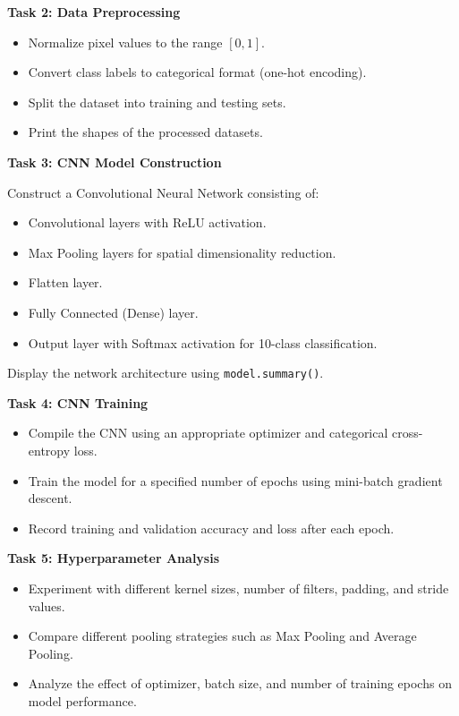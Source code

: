 \documentclass[11pt]{article}
\begin{document}
\bigskip

\textbf{Task 2: Data Preprocessing}

\begin{itemize}
    \item Normalize pixel values to the range $[0,1]$.
    \item Convert class labels to categorical format (one-hot encoding).
    \item Split the dataset into training and testing sets.
    \item Print the shapes of the processed datasets.
\end{itemize}


\bigskip

\textbf{Task 3: CNN Model Construction}

Construct a Convolutional Neural Network consisting of:

\begin{itemize}
    \item Convolutional layers with ReLU activation.
    \item Max Pooling layers for spatial dimensionality reduction.
    \item Flatten layer.
    \item Fully Connected (Dense) layer.
    \item Output layer with Softmax activation for 10-class classification.
\end{itemize}

Display the network architecture using \texttt{model.summary()}.


\bigskip

\textbf{Task 4: CNN Training}

\begin{itemize}
    \item Compile the CNN using an appropriate optimizer and categorical cross-entropy loss.
    \item Train the model for a specified number of epochs using mini-batch gradient descent.
    \item Record training and validation accuracy and loss after each epoch.
\end{itemize}

\bigskip

\textbf{Task 5: Hyperparameter Analysis}

\begin{itemize}
    \item Experiment with different kernel sizes, number of filters, padding, and stride values.
    \item Compare different pooling strategies such as Max Pooling and Average Pooling.
    \item Analyze the effect of optimizer, batch size, and number of training epochs on model performance.
\end{itemize}
\end{document}
